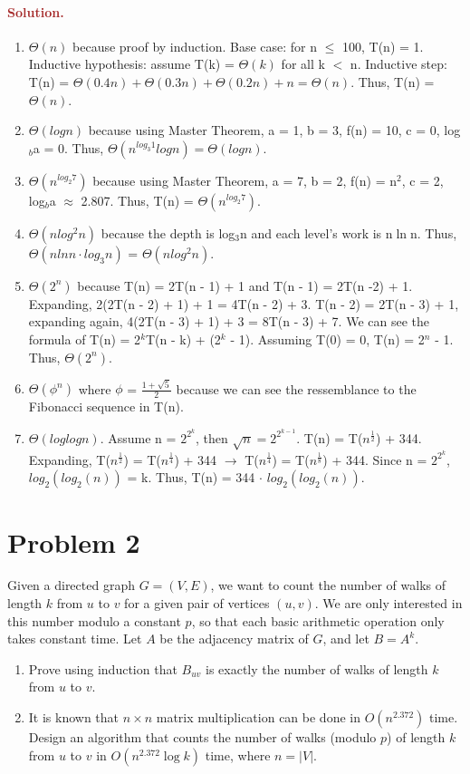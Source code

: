 \paragraph{\textcolor{brown}{Solution.}}
\begin{enumerate}
    \item $\Theta(n)$ because proof by induction. Base case: for n $\le$ 100, T(n) = 1. Inductive hypothesis: assume T(k) = $\Theta(k)$ for all k $<$ n. Inductive step: T(n) = $\Theta(0.4n) + \Theta(0.3n) + \Theta(0.2n) + n = \Theta(n)$. Thus, T(n) = $\Theta(n)$.
    \item $\Theta(logn)$ because using Master Theorem, a = 1, b = 3, f(n) = 10, c = 0, log$_b$a = 0. Thus, $\Theta(n^{log_3 1}logn) = \Theta(logn)$.
    \item $\Theta(n^{log_2 7})$ because using Master Theorem, a = 7, b = 2, f(n) = n$^2$, c = 2, log$_b$a $\approx$ 2.807. Thus, T(n) = $\Theta(n^{log_2 7})$.
    \item $\Theta(nlog^2n)$ because the depth is log$_3$n and each level's work is n$\ln$n. Thus, $\Theta(nlnn\cdot log_3n)$ = $\Theta(nlog^2n)$.
    \item $\Theta(2^n)$ because T(n) = 2T(n - 1) + 1 and T(n - 1) = 2T(n -2) + 1. Expanding, 2(2T(n - 2) + 1) + 1 = 4T(n - 2) + 3. T(n - 2) = 2T(n - 3) + 1, expanding again, 4(2T(n - 3) + 1) + 3 = 8T(n - 3) + 7. We can see the formula of T(n) = 2$^k$T(n - k) + (2$^k$ - 1). Assuming T(0) = 0, T(n) = 2$^n$ - 1. Thus, $\Theta(2^n)$.
    \item $\Theta(\phi^n)$ where $\phi$ = $\frac{1 + \sqrt{5}}{2}$ because we can see the ressemblance to the Fibonacci sequence in T(n). 
    \item $\Theta(loglogn)$. Assume n = $2^{2^k}$, then $\sqrt{n} = 2^{2^{k - 1}}$. T(n) = T($n^{\frac{1}{2}}$) + 344. Expanding, T($n^{\frac{1}{2}}$) = T($n^{\frac{1}{4}}$) + 344 $\rightarrow$ T($n^{\frac{1}{4}}$) = T($n^{\frac{1}{8}}$) + 344. Since n = $2^{2^k}$, $log_2(log_2(n))$ = k. Thus, T(n) = 344 $\cdot$ $log_2(log_2(n))$.
\end{enumerate}

\section*{Problem 2}
Given a directed graph $G = (V, E)$, we want to count the number of walks of length $k$ from $u$ to $v$ for a given pair of vertices $(u, v)$. We are only interested in this number modulo a constant $p$, so that each basic arithmetic operation only takes constant time. Let $A$ be the adjacency matrix of $G$, and let $B = A^k$.
\begin{enumerate}
    \item Prove using induction that $B_{uv}$ is exactly the number of walks of length $k$ from $u$ to $v$.
    \item It is known that $n \times n$ matrix multiplication can be done in $O(n^{2.372})$ time. Design an algorithm that counts the number of walks (modulo $p$) of length $k$ from $u$ to $v$ in $O(n^{2.372} \log k)$ time, where $n = |V|$.
\end{enumerate}

